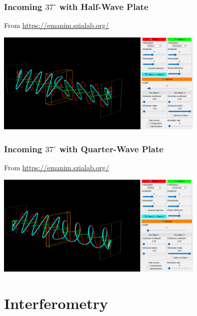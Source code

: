 \documentclass{beamer}
\begin{document}
\begin{frame}\frametitle{Incoming $37^\circ$ with Half-Wave Plate}
From \url{https://emanim.szialab.org/}

\begin{center}
\includegraphics[width=10cm]{fig/waveplate_37_2.png}
\end{center}
\end{frame}

\begin{frame}\frametitle{Incoming $37^\circ$ with Quarter-Wave Plate}
From \url{https://emanim.szialab.org/}

\begin{center}
\includegraphics[width=10cm]{fig/waveplate_37_4.png}
\end{center}
\end{frame}

\section{Interferometry}
\end{document}
